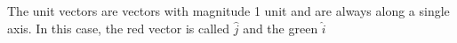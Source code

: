 \documentclass[preview]{standalone}
\begin{document}
\begin{minipage}
{8cm}The unit vectors are vectors with magnitude 1 unit and are always along a single axis. In this case, the red vector is called $\hat{j}$ and the green $\hat{i}$
\end{minipage}
\end{document}
